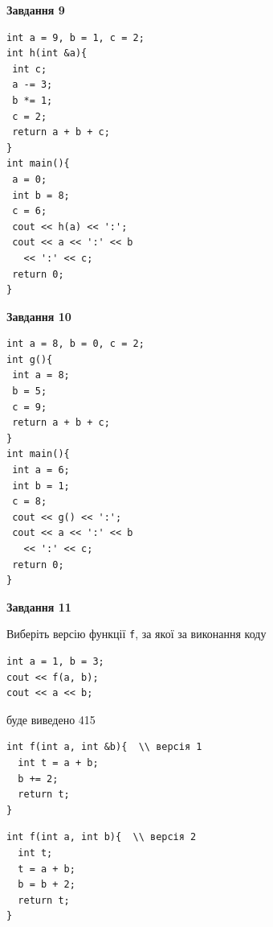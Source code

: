 \documentclass[12pt, ukrainian]{article}
\def\code#1{\Verb!#1!}
\begin{document}
{\begin {large}
\begin{minipage}[t]{11.0cm}
\end{minipage}


\begin{minipage}[t]{7.0cm}

\begin{center}
\textbf{Завдання 9}
\end{center}
\vspace{-8mm}

\begin{verbatim}
int a = 9, b = 1, c = 2;
int h(int &a){
 int c;
 a -= 3;
 b *= 1;
 c = 2;
 return a + b + c;
}
int main(){
 a = 0;
 int b = 8;
 c = 6;
 cout << h(a) << ':';
 cout << a << ':' << b 
   << ':' << c;
 return 0;
}
\end{verbatim}



\begin{center}
\textbf{Завдання 10}
\end{center}
\vspace{-8mm}

\begin{verbatim}
int a = 8, b = 0, c = 2;
int g(){
 int a = 8;
 b = 5;
 c = 9;
 return a + b + c;
}
int main(){
 int a = 6;
 int b = 1;
 c = 8;
 cout << g() << ':';
 cout << a << ':' << b 
   << ':' << c;
 return 0;
}
\end{verbatim}

\end{minipage}
\vline \hspace{1mm}
\begin{minipage}[t]{11.0cm}

\begin{center}
\textbf{Завдання 11}
\end{center}
Виберіть версію функції \code{f}, за якої за виконання коду
\begin{verbatim}
int a = 1, b = 3;
cout << f(a, b);
cout << a << b;
\end{verbatim}

буде виведено 415

\begin{verbatim}
int f(int a, int &b){  \\ версія 1
  int t = a + b;
  b += 2;
  return t;
}
\end{verbatim}

\vspace{-8mm}\begin{verbatim}
int f(int a, int b){  \\ версія 2
  int t;
  t = a + b;
  b = b + 2;
  return t;
}
\end{verbatim}


\end{minipage}
\end{large}}
\end{document}
